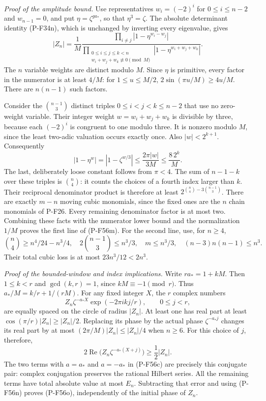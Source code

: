 \documentclass[11pt,a4paper]{article}
\begin{document}
\emph{Proof of the amplitude bound.}
Use representatives
$w_i=(-2)^i$ for $0\le i\le n-2$ and $w_{n-1}=0$,
and put $\eta=\zeta^{ga_*}$, so that $\eta^3=\zeta$.
The absolute determinant identity (P-F34n), which is unchanged
by inverting every eigenvalue, gives
\[
 |Z_n|=\frac1M
 \frac{\displaystyle\prod_{i\ne j}|1-\eta^{w_i-w_j}|}
      {\displaystyle\prod_{\substack{0\le i\le j\le k<n\\
                     w_i+w_j+w_k\not\equiv0\pmod M}}
                        |1-\eta^{w_i+w_j+w_k}|}.
 \tag{P-F56q}
\]
The $n$ variable weights are distinct modulo $M$.
Since $\eta$ is primitive, every factor in the numerator
is at least $4/M$: for $1\le u\le M/2$,
$2\sin(\pi u/M)\ge4u/M$.
There are $n(n-1)$ such factors.

Consider the $\binom{n-1}3$ distinct triples
$0\le i<j<k\le n-2$ that use no zero-weight variable.
Their integer weight
$w=w_i+w_j+w_k$ is divisible by three, because each
$(-2)^i$ is congruent to one modulo three.
It is nonzero modulo $M$, since the least two-adic
valuation occurs exactly once.
Also $|w|<2^{k+1}$. Consequently
\[
 |1-\eta^w|
   =|1-\zeta^{w/3}|
   \le\frac{2\pi|w|}{3M}
   \le\frac{8\,2^k}{M}.
 \tag{P-F56r}
\]
The last, deliberately loose constant follows from $\pi<4$.
The sum of $n-1-k$ over these triples is $\binom n4$:
it counts the choices of a fourth index larger than $k$.
Their reciprocal denominator product is therefore at least
$2^{\binom n4-3\binom{n-1}3}$.
There are exactly $m-n$ moving cubic monomials, since the
fixed ones are the $n$ chain monomials of P-F26.
Every remaining denominator factor is at most two.
Combining these facts with the numerator lower bound and
the normalization $1/M$ proves the first line of (P-F56m).
For the second line, use, for $n\ge4$,
\[
 \binom n4\ge n^4/24-n^3/4,\quad
 2\binom{n-1}3\le n^3/3,\quad
 m\le n^3/3,\quad
 (n-3)n(n-1)\le n^3.
 \]
Their total cubic loss is at most $23n^3/12<2n^3$.

\emph{Proof of the bounded-window and index implications.}
Write $ra_*=1+kM$. Then $1\le k<r$ and
$\gcd(k,r)=1$, since $kM\equiv-1\pmod r$.
Thus
$a_*/M=k/r+1/(rM)$.
For any fixed integer $X$, the $r$ complex numbers
\[
 Z_n\zeta^{-a_*X}\exp(-2\pi i k j/r),
                   \qquad 0\le j<r,
 \]
are equally spaced on the circle of radius $|Z_n|$.
At least one has real part at least
$\cos(\pi/r)|Z_n|\ge |Z_n|/2$.
Replacing its phase by the actual phase
$\zeta^{-a_*j}$ changes its real part by at most
$(2\pi/M)|Z_n|\le |Z_n|/4$ when $n\ge6$.
For this choice of $j$, therefore,
\[
 2\operatorname{Re}
        \bigl(Z_n\zeta^{-a_*(X+j)}\bigr)
                         \ge\frac12|Z_n|.
 \tag{P-F56s}
\]
The two terms with $a=a_*$ and $a=-a_*$
in (P-F56c) are precisely this conjugate pair:
complex conjugation preserves the rational Hilbert series.
All the remaining terms have total absolute value at most
$E_n$. Subtracting that error and using (P-F56n) proves
(P-F56o), independently of the initial phase of $Z_n$.
\end{document}
